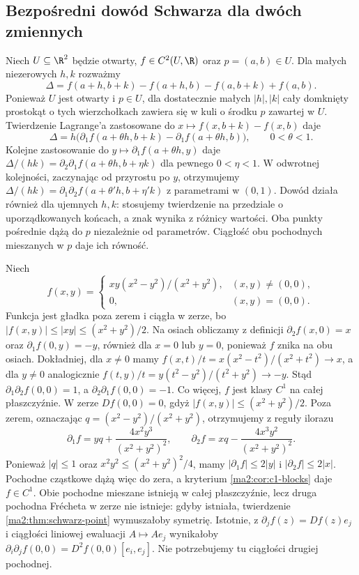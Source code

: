 \subsection{Bezpośredni dowód Schwarza dla dwóch zmiennych}

Niech $U\subseteq\R^2$ będzie otwarty,
$f\in C^2(U,\R)$ oraz $p=(a,b)\in U$. Dla małych niezerowych $h,k$ rozważmy
\[
 \Delta=f(a+h,b+k)-f(a+h,b)-f(a,b+k)+f(a,b).
\]
Ponieważ $U$ jest otwarty i $p\in U$, dla dostatecznie małych $|h|,|k|$ cały domknięty prostokąt o tych wierzchołkach zawiera się w kuli o środku $p$ zawartej w $U$.
Twierdzenie Lagrange'a zastosowane do
$x\mapsto f(x,b+k)-f(x,b)$ daje
\[
 \Delta=h\bigl(\partial_1 f(a+\theta h,b+k)
                  -\partial_1 f(a+\theta h,b)\bigr),
 \qquad 0<\theta<1.
\]
Kolejne zastosowanie do $y\mapsto\partial_1 f(a+\theta h,y)$
daje $\Delta/(hk)=\partial_2\partial_1 f
(a+\theta h,b+\eta k)$ dla pewnego $0<\eta<1$.
W odwrotnej kolejności, zaczynając od przyrostu po $y$,
otrzymujemy $\Delta/(hk)=\partial_1\partial_2 f
(a+\theta' h,b+\eta' k)$ z parametrami w $(0,1)$.
Dowód działa również dla ujemnych $h,k$: stosujemy
twierdzenie na przedziale o uporządkowanych końcach,
a znak wynika z różnicy wartości.
Oba punkty pośrednie dążą do $p$ niezależnie od parametrów.
Ciągłość obu pochodnych mieszanych w $p$ daje ich równość.

\begin{przyklad}
\label{ma2:ex:unequal-mixed}
Niech
\[
 f(x,y)=
 \begin{cases}
 xy(x^2-y^2)/(x^2+y^2),&(x,y)\ne(0,0),\\
 0,&(x,y)=(0,0).
 \end{cases}
\]
Funkcja jest gładka poza zerem i ciągła w zerze,
bo $|f(x,y)|\le |xy|\le(x^2+y^2)/2$.
Na osiach obliczamy z definicji
$\partial_2 f(x,0)=x$ oraz $\partial_1 f(0,y)=-y$,
również dla $x=0$ lub $y=0$, ponieważ $f$ znika
na obu osiach. Dokładniej, dla $x\ne0$ mamy
$f(x,t)/t=x(x^2-t^2)/(x^2+t^2)\to x$,
a dla $y\ne0$ analogicznie
$f(t,y)/t=y(t^2-y^2)/(t^2+y^2)\to-y$.
Stąd
$\partial_1\partial_2 f(0,0)=1$,
a $\partial_2\partial_1 f(0,0)=-1$.
Co więcej, $f$ jest klasy $C^1$ na całej płaszczyźnie.
W zerze $Df(0,0)=0$, gdyż $|f(x,y)|\le(x^2+y^2)/2$.
Poza zerem, oznaczając $q=(x^2-y^2)/(x^2+y^2)$,
otrzymujemy z reguły ilorazu
\[
 \partial_1 f=yq+\frac{4x^2y^3}{(x^2+y^2)^2},
 \qquad
 \partial_2 f=xq-\frac{4x^3y^2}{(x^2+y^2)^2}.
\]
Ponieważ $|q|\le1$ oraz
$x^2y^2\le (x^2+y^2)^2/4$, mamy
$|\partial_1 f|\le2|y|$ i $|\partial_2 f|\le2|x|$.
Pochodne cząstkowe dążą więc do zera, a kryterium
\ref{ma2:cor:c1-blocks} daje $f\in C^1$.
Obie pochodne mieszane istnieją w całej płaszczyźnie,
lecz druga pochodna Frécheta w zerze nie istnieje:
gdyby istniała, twierdzenie
\ref{ma2:thm:schwarz-point} wymuszałoby symetrię.
Istotnie, z $\partial_jf(z)=Df(z)e_j$ i ciągłości
liniowej ewaluacji $A\mapsto Ae_j$ wynikałoby
$\partial_i\partial_jf(0,0)=D^2f(0,0)[e_i,e_j]$.
Nie potrzebujemy tu ciągłości drugiej pochodnej.
\end{przyklad}

